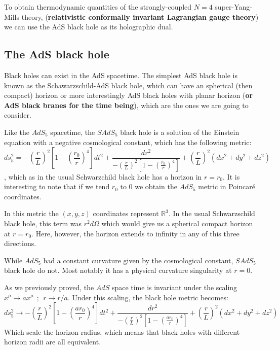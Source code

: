 \documentclass[12pt]{article}
\begin{document}
To obtain thermodynamic quantities of the strongly-coupled $N=4$ super-Yang-Mills theory, (\textbf{relativistic conformally invariant Lagrangian gauge theory}) we can use the AdS black hole as its holographic dual.

\subsection{The AdS black hole}

Black holes can exist in the AdS spacetime. The simplest AdS black hole is known as the Schawarzschild-AdS black hole, which can have an spherical (then compact) horizon or more interestingly AdS black holes with planar horizon (\textbf{or AdS black branes for the time being}), which are the ones we are going to consider.

\vspace{.25cm}

Like the $AdS_5$ spacetime, the $SAdS_5$ black hole is a solution of the Einstein equation with a negative cosmological constant, which has the following metric:
\[
    ds_5^2 = -\left(\frac{r}{L}\right)^2 \left[1-\left(\frac{r_0}{r}\right)^4\right]dt^2 + \frac{dr^2}{-\left(\frac{r}{L}\right)^2 \left[1-\left(\frac{r_0}{r}\right)^4\right]} + \left(\frac{r}{L}\right)^2(dx^2+dy^2+dz^2)
\]
, which as in the usual Schwarzchild black hole has a horizon in $r=r_0$. It is interesting to note that if we tend $r_0$ to 0 we obtain the $AdS_5$ metric in Poincaré coordinates. 

\vspace{.25cm}

In this metric the $(x,y,z)$ coordinates represent $\mathbb{R}^3$. In the usual Schwarzschild black hole, this term was $r^2d\Omega$ which would give us a spherical compact horizon at $r=r_0$. Here, however, the horizon extends to infinity in any of this three directions.

\vspace{.25cm}

While $AdS_5$ had a constant curvature given by the cosmological constant, $SAdS_5$ black hole do not. Most notably it has a physical curvature singularity at $r=0$. 

As we previously proved, the $AdS$ space time is invariant under the scaling $x^\mu\rightarrow ax^\mu~~;~~r\longrightarrow r/a$. Under this scaling, the black hole metric becomes:
\[
     ds_5^2 \rightarrow -\left(\frac{r}{L}\right)^2 \left[1-\left(\frac{ar_0}{r}\right)^4\right]dt^2 + \frac{dr^2}{-\left(\frac{r}{L}\right)^2 \left[1-\left(\frac{ar_0}{r}\right)^4\right]} + \left(\frac{r}{L}\right)^2(dx^2+dy^2+dz^2)
\]
Which scale the horizon radius, which means that black holes with different horizon radii are all equivalent.
\end{document}
